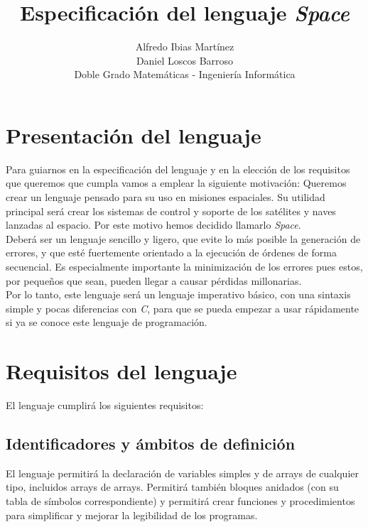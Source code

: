 \documentclass[a4paper, 12pt]{article}
\begin{document}
\title{\Huge \bf Especificación del lenguaje \textit{Space}}
\author{
	\small Alfredo Ibias Martínez\\
	\small Daniel Loscos Barroso\\
    \small Doble Grado Matemáticas - Ingeniería Informática
    }
\date{}
\maketitle

\section{Presentación del lenguaje}
Para guiarnos en la especificación del lenguaje y en la elección de los requisitos que queremos que cumpla vamos a emplear la siguiente motivación: Queremos crear un lenguaje pensado para su uso en misiones espaciales. Su utilidad principal será crear los sistemas de control y soporte de los satélites y naves lanzadas al espacio. Por este motivo hemos decidido llamarlo \textit{Space}.\\

Deberá ser un lenguaje sencillo y ligero, que evite lo más posible la generación de errores, y que esté fuertemente orientado a la ejecución de órdenes de forma secuencial. Es especialmente importante la minimización de los errores pues estos, por pequeños que sean, pueden llegar a causar pérdidas millonarias.\\

Por lo tanto, este lenguaje será un lenguaje imperativo básico, con una sintaxis simple y pocas diferencias con \textit{C}, para que se pueda empezar a usar rápidamente si ya se conoce este lenguaje de programación.

\section{Requisitos del lenguaje}
El lenguaje cumplirá los siguientes requisitos:

\subsection{Identificadores y ámbitos de definición}
El lenguaje permitirá la declaración de variables simples y de arrays de cualquier tipo, incluidos arrays de arrays. Permitirá también bloques anidados (con su tabla de símbolos correspondiente) y permitirá crear funciones y procedimientos para simplificar y mejorar la legibilidad de los programas.\\
\end{document}
